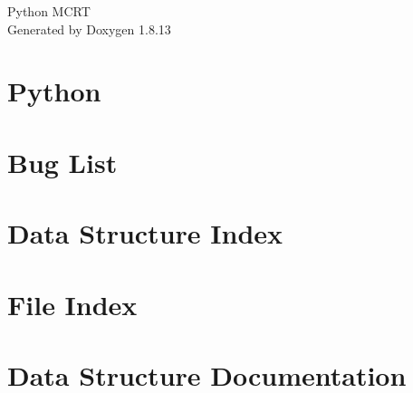 \documentclass[twoside]{book}
\newcommand{\+}{\discretionary{\mbox{\scriptsize$\hookleftarrow$}}{}{}}
\newcommand{\clearemptydoublepage}{%
  \newpage{\pagestyle{empty}\cleardoublepage}%
}
\begin{document}
\hypersetup{pageanchor=false,
             bookmarksnumbered=true,
             pdfencoding=unicode
            }
\begin{titlepage}
\vspace*{7cm}
\begin{center}%
{\Large Python M\+C\+RT }\\
\vspace*{1cm}
{\large Generated by Doxygen 1.8.13}\\
\end{center}
\end{titlepage}
\clearemptydoublepage
{}
\tableofcontents
\clearemptydoublepage
{}
\hypersetup{pageanchor=true}

\chapter{Python}
\label{index}\hypertarget{index}{}
\chapter{Bug List}
\label{bug}

\chapter{Data Structure Index}

\chapter{File Index}

\chapter{Data Structure Documentation}










































\end{document}
